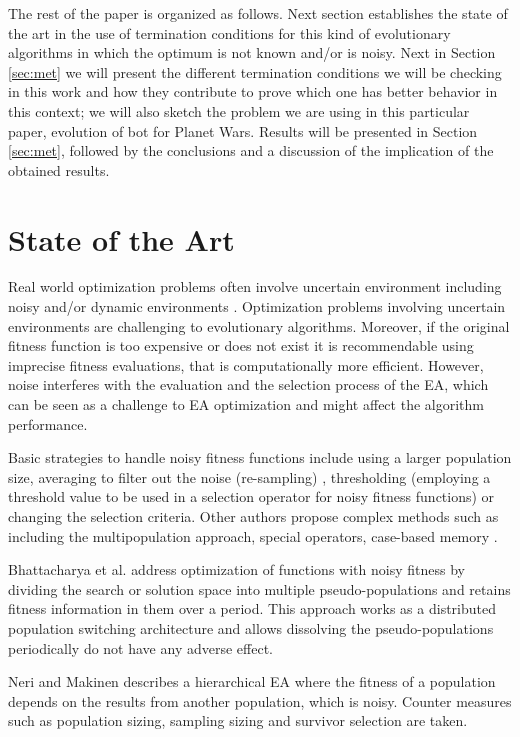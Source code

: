 \documentclass[runningheads,a4paper]{llncs}
\begin{document}
The rest of the paper is organized as follows. Next section
establishes the state of the art in the use of termination conditions
for this kind of evolutionary algorithms in which the optimum is not
known and/or is noisy. Next in Section \ref{sec:met} we will present the different termination
conditions we will be checking in this work and how they contribute to
prove which one has better behavior in this context; we will also
sketch the problem we are using in this particular paper, evolution of
bot for Planet Wars. Results will be presented in Section
\ref{sec:met}, followed by the conclusions and a discussion of the
implication of the obtained results.

\section{State of the Art}

Real world optimization problems often involve uncertain environment including noisy and/or dynamic environments \cite{Jin2005303,QianYZ13}.
Optimization problems involving uncertain environments are challenging to evolutionary algorithms. 
Moreover, if the original fitness function is too expensive or does not exist it is recommendable using imprecise fitness evaluations, that is computationally more efficient.
However, noise interferes with the evaluation and the selection process of the EA, which can be seen as a challenge to EA optimization and might affect the algorithm performance.

Basic strategies to handle noisy fitness functions include using a larger population size, averaging to filter out the noise (re-sampling) \cite{Branke98,Branke2001}, thresholding (employing a threshold value to be used in a selection operator for noisy fitness functions) \cite{Markon2001} or changing the selection criteria.
Other authors propose complex methods such as including the multipopulation approach, special operators, case-based memory \cite{BhattacharyaIM14}. 

Bhattacharya et al. \cite{BhattacharyaIM14} address optimization of functions with noisy fitness by dividing the search or solution space into multiple pseudo-populations and retains fitness information in them over a period. This approach works as a distributed population switching architecture and allows dissolving the pseudo-populations periodically do not have any adverse effect.


Neri and Makinen \cite{Neri2007} describes a hierarchical EA where the fitness of a population depends on the results from another population, which is noisy. Counter measures such as population sizing, sampling sizing and survivor selection are taken.
\end{document}
